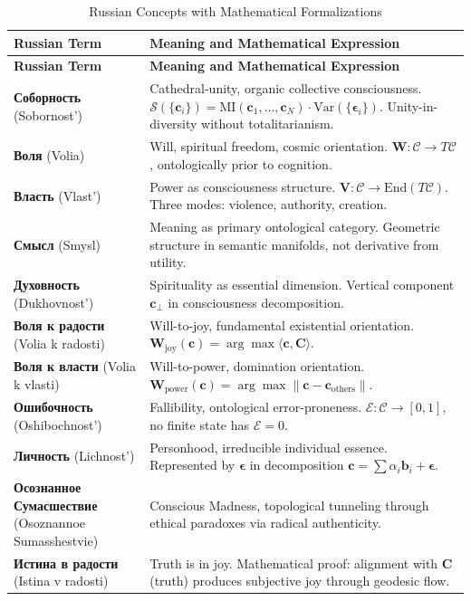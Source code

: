 \documentclass[11pt,a4paper]{article}
\theoremstyle{definition}
\theoremstyle{remark}
\newcommand{\CC}{\mathcal{C}}
\newcommand{\WW}{\mathbf{W}}
\newcommand{\VV}{\mathbf{V}}
\newcommand{\bb}{\mathbf{b}}
\newcommand{\cc}{\mathbf{c}}
\begin{document}
\begin{longtable}{|l|p{10cm}|}
\caption{Russian Concepts with Mathematical Formalizations} \\
\hline
\textbf{Russian Term} & \textbf{Meaning and Mathematical Expression} \\
\hline
\endfirsthead
\hline
\textbf{Russian Term} & \textbf{Meaning and Mathematical Expression} \\
\hline
\endhead
\hline
\endfoot

\textbf{Соборность} (Sobornost') & Cathedral-unity, organic collective consciousness. \(\mathcal{S}(\{\cc_i\}) = \text{MI}(\cc_1, \ldots, \cc_N) \cdot \text{Var}(\{\boldsymbol{\epsilon}_i\})\). Unity-in-diversity without totalitarianism. \\
\hline
\textbf{Воля} (Volia) & Will, spiritual freedom, cosmic orientation. \(\WW: \CC \to T\CC\), ontologically prior to cognition. \\
\hline
\textbf{Власть} (Vlast') & Power as consciousness structure. \(\VV: \CC \to \text{End}(T\CC)\). Three modes: violence, authority, creation. \\
\hline
\textbf{Смысл} (Smysl) & Meaning as primary ontological category. Geometric structure in semantic manifolds, not derivative from utility. \\
\hline
\textbf{Духовность} (Dukhovnost') & Spirituality as essential dimension. Vertical component \(\cc_{\perp}\) in consciousness decomposition. \\
\hline
\textbf{Воля к радости} (Volia k radosti) & Will-to-joy, fundamental existential orientation. \(\WW_{\text{joy}}(\cc) = \arg\max \langle \cc, \mathbf{C} \rangle\). \\
\hline
\textbf{Воля к власти} (Volia k vlasti) & Will-to-power, domination orientation. \(\WW_{\text{power}}(\cc) = \arg\max \|\cc - \cc_{\text{others}}\|\). \\
\hline
\textbf{Ошибочность} (Oshibochnost') & Fallibility, ontological error-proneness. \(\mathcal{E}: \CC \to [0,1]\), no finite state has \(\mathcal{E} = 0\). \\
\hline
\textbf{Личность} (Lichnost') & Personhood, irreducible individual essence. Represented by \(\boldsymbol{\epsilon}\) in decomposition \(\cc = \sum \alpha_i \bb_i + \boldsymbol{\epsilon}\). \\
\hline
\textbf{Осознанное Сумасшествие} (Osoznannoe Sumasshestvie) & Conscious Madness, topological tunneling through ethical paradoxes via radical authenticity. \\
\hline
\textbf{Истина в радости} (Istina v radosti) & Truth is in joy. Mathematical proof: alignment with \(\mathbf{C}\) (truth) produces subjective joy through geodesic flow. \\
\hline
\end{longtable}
\end{document}
